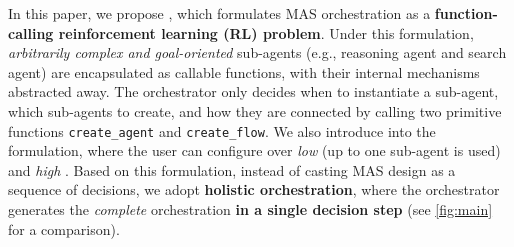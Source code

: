In this paper, we propose \textbf{\ourframework},
which formulates MAS orchestration as a \textbf{function-calling reinforcement learning (RL) problem}. Under this formulation, \textit{arbitrarily complex and goal-oriented} sub-agents (e.g., reasoning agent and search agent) are encapsulated as callable functions, with their internal mechanisms abstracted away. The orchestrator only decides when to instantiate a sub-agent, which sub-agents to create, and how they are connected by calling two primitive functions \texttt{create_agent} and \texttt{create_flow}. We also introduce \textbf{\masness} into the formulation, where the user can configure over \textit{low} (up to one sub-agent is used) and \textit{high \masness}. Based on this formulation, instead of casting MAS design as a sequence of decisions, we adopt \textbf{holistic orchestration}, where the orchestrator generates the \textit{complete}  orchestration \textbf{in a single decision step} {(see \cref{fig:main} for a comparison}). 
